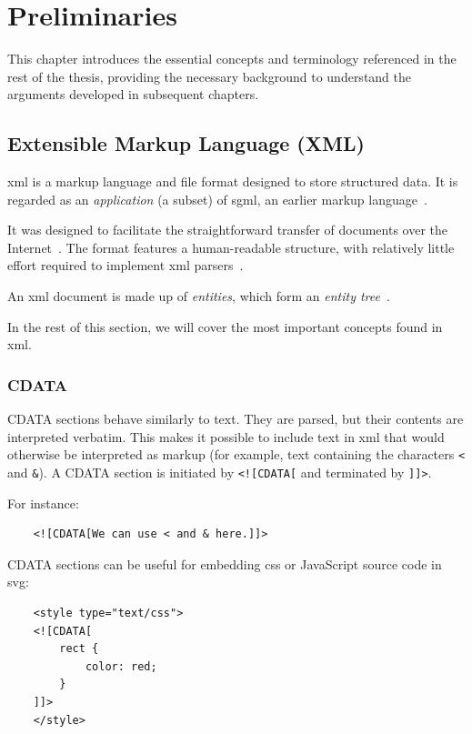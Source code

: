 \chapter{Preliminaries}\label{chap:preliminaries}

This chapter introduces the essential concepts and terminology referenced in the rest of the thesis, providing the necessary background to understand the arguments developed in subsequent chapters.

\section{Extensible Markup Language (XML)}\label{sec:xml}

\gls{xml} is a markup language and file format designed to store structured data.
It is regarded as an \emph{application} (a subset) of \gls{sgml}, an earlier markup language~\cite[Sec.~1.1]{xml11}.

It was designed to facilitate the straightforward transfer of documents over the Internet~\cite[Sec.~1.1]{xml11}. The format features a human-readable structure, with relatively little effort required to implement \gls{xml} parsers~\cite[Sec.~1.1]{xml11}.

An \gls{xml} document is made up of \emph{entities}, which form an \emph{entity tree}~\cite[Sec.~2]{xml11}.

In the rest of this section, we will cover the most important concepts found in \gls{xml}.

\subsection{CDATA}

CDATA sections behave similarly to text. They are parsed, but their contents are interpreted verbatim. This makes it possible to include text in \gls{xml} that would otherwise be interpreted as markup (for example, text containing the characters \texttt{<} and \texttt{\&}). A CDATA section is initiated by \texttt{<![CDATA[} and terminated by \texttt{]]>}. 
\begin{samepage}
For instance:
\begin{verbatim}
    <![CDATA[We can use < and & here.]]>
\end{verbatim}
\end{samepage}
\begin{samepage}
CDATA sections can be useful for embedding \gls{css} or JavaScript source code in \gls{svg}:
\begin{verbatim}
    <style type="text/css">
    <![CDATA[
        rect {
            color: red;
        }
    ]]>
    </style>
\end{verbatim}
\end{samepage}

